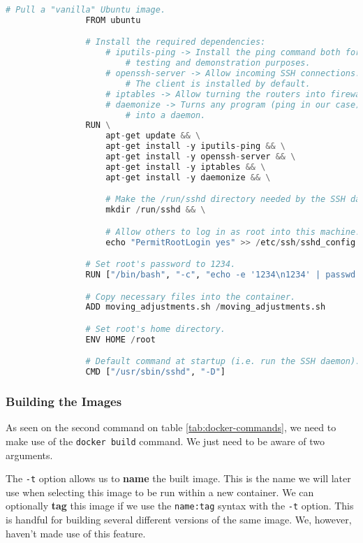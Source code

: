             \begin{lstlisting}[language = python, caption = \texttt{Dockerfile} for our virtual routers., label = lst:router-dockerfile]
                # Pull a "vanilla" Ubuntu image.
                FROM ubuntu

                # Install the required dependencies:
                    # iputils-ping -> Install the ping command both for
                        # testing and demonstration purposes.
                    # openssh-server -> Allow incoming SSH connections.
                        # The client is installed by default.
                    # iptables -> Allow turning the routers into firewalls.
                    # daemonize -> Turns any program (ping in our case)
                        # into a daemon.
                RUN \
                    apt-get update && \
                    apt-get install -y iputils-ping && \
                    apt-get install -y openssh-server && \
                    apt-get install -y iptables && \
                    apt-get install -y daemonize && \

                    # Make the /run/sshd directory needed by the SSH daemon.
                    mkdir /run/sshd && \

                    # Allow others to log in as root into this machine.
                    echo "PermitRootLogin yes" >> /etc/ssh/sshd_config

                # Set root's password to 1234.
                RUN ["/bin/bash", "-c", "echo -e '1234\n1234' | passwd root"]

                # Copy necessary files into the container.
                ADD moving_adjustments.sh /moving_adjustments.sh

                # Set root's home directory.
                ENV HOME /root

                # Default command at startup (i.e. run the SSH daemon).
                CMD ["/usr/sbin/sshd", "-D"]
            \end{lstlisting}

            \subsubsection{Building the Images}
                As seen on the second command on table \ref{tab:docker-commands}, we need to make use of the \texttt{docker build} command. We just need to be aware of two arguments.
                
                The \texttt{-t} option allows us to \textbf{name} the built image. This is the name we will later use when selecting this image to be run within a new container. We can optionally \textbf{tag} this image if we use the \texttt{name:tag} syntax with the \texttt{-t} option. This is handful for building several different versions of the same image. We, however, haven't made use of this feature.

